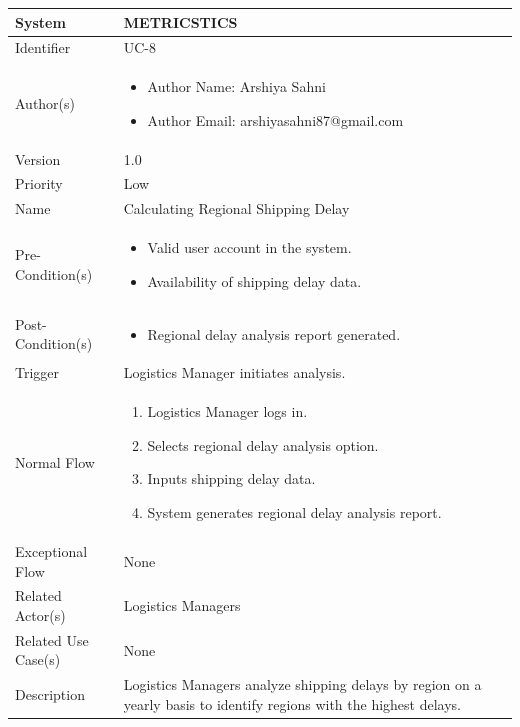 \begin{center}
	\begin{tabularx}{\textwidth}{|l|X|}
		\hline
		System & METRICSTICS \\
		\hline
		Identifier & UC-8 \\
		\hline
		Author(s) & \begin{itemize}[left=0pt]
			\item Author Name: Arshiya Sahni
			\item Author Email: arshiyasahni87@gmail.com
		\end{itemize} \\
		\hline
		Version & 1.0 \\
		\hline
		Priority & Low \\
		\hline
		Name & Calculating Regional Shipping Delay \\
		\hline
		Pre-Condition(s) &  \begin{itemize}[left=0pt]
			\item Valid user account in the system.
			\item Availability of shipping delay data.
		\end{itemize} \\
		\hline
		Post-Condition(s) & \begin{itemize}[left=0pt]
			\item Regional delay analysis report generated.
		\end{itemize} \\
		\hline
		Trigger & Logistics Manager initiates analysis. \\
		\hline
		Normal Flow & \begin{enumerate}[left=0pt]
			\item Logistics Manager logs in.
			\item Selects regional delay analysis option.
			\item Inputs shipping delay data.
			\item System generates regional delay analysis report.
		\end{enumerate} \\
		\hline
		Exceptional Flow & None \\
		\hline
		Related Actor(s) & Logistics Managers \\
		\hline
		Related Use Case(s) & None \\
		\hline
		Description & Logistics Managers analyze shipping delays by region on a yearly basis to identify regions with the highest delays. \\
		\hline
	\end{tabularx}
\end{center}

